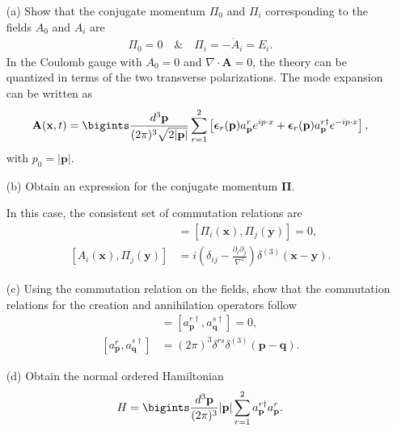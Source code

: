 \begin{itemize}
    \item[(a)] Show that the conjugate momentum $\Pi_0$ and $\Pi_i$ corresponding to the fields $A_0$ and $A_i$ are
    \begin{align}
        \Pi_0 = 0 \quad \& \quad \Pi_i = -\dot{A}_i = E_i.
    \end{align}
    In the Coulomb gauge with $A_0 = 0$ and $\nabla \cdot \mathbf{A} = 0$, the theory can be quantized in terms of the two transverse polarizations. The mode expansion can be written as
    \begin{align}
        \mathbf{A}(\mathbf{x}, t) = \bigints\frac{d^3 \mathbf{p}}{(2\pi)^3 \sqrt{2|\mathbf{p}|}} \sum_{r=1}^2 \left[ \boldsymbol{\epsilon}_r(\mathbf{p}) a^r_{\mathbf{p}} e^{i p \cdot x} + \boldsymbol{\epsilon}_r(\mathbf{p}) a^{r\dagger}_{\mathbf{p}} e^{-i p \cdot x} \right], 
    \end{align}
    with $p_0 = |\mathbf{p}|$.

    \item[(b)] Obtain an expression for the conjugate momentum $\boldsymbol{\Pi}$.

    In this case, the consistent set of commutation relations are
    \begin{align}
        [A_i(\mathbf{x}), A_j(\mathbf{y})] &= [\Pi_i(\mathbf{x}), \Pi_j(\mathbf{y})] = 0, \label{eq:given-relation-for-A}\\
        [A_i(\mathbf{x}), \Pi_j(\mathbf{y})] &= i \left( \delta_{ij} - \frac{\partial_i \partial_j}{\nabla^2} \right) \delta^{(3)}(\mathbf{x} - \mathbf{y}).\label{eq:given-relation-for-A-pi}
    \end{align}
    \item[(c)] Using the commutation relation on the fields, show that the commutation relations for the creation and annihilation operators follow
    \begin{align}
        [a^r_{\mathbf{p}}, a^s_{\mathbf{q}}] &= [a^{r\dagger}_{\mathbf{p}}, a^{s\dagger}_{\mathbf{q}}] = 0, \label{eq:given-relation-for-creation-operators-1}\\
        \left[a^r_{\mathbf{p}}, a^{s\dagger}_{\mathbf{q}}\right] &= (2\pi)^3 \delta^{rs} \delta^{(3)}(\mathbf{p} - \mathbf{q})\label{eq:given-relation-for-creation-operators-2}. 
    \end{align}
    \item[(d)] Obtain the normal ordered Hamiltonian
    \begin{align}
        H = \bigints\frac{d^3 \mathbf{p}}{(2\pi)^3} |\mathbf{p}| \sum_{r=1}^2 a^{r\dagger}_{\mathbf{p}} a^r_{\mathbf{p}}.
    \end{align}
\end{itemize}


